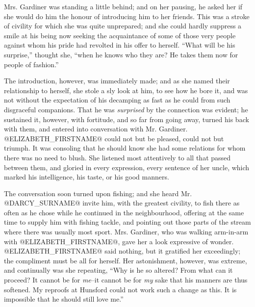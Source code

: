 Mrs. Gardiner was standing a little behind; and on her pausing, he asked
her if she would do him the honour of introducing him to her friends.
This was a stroke of civility for which she was quite unprepared;
and she could hardly suppress a smile at his being now seeking the
acquaintance of some of those very people against whom his pride had
revolted in his offer to herself. ``What will be his surprise,'' thought
she, ``when he knows who they are? He takes them now for people of
fashion.''

The introduction, however, was immediately made; and as she named their
relationship to herself, she stole a sly look at him, to see how he bore
it, and was not without the expectation of his decamping as fast as he
could from such disgraceful companions. That he was \textit{surprised} by the
connection was evident; he sustained it, however, with fortitude, and
so far from going away, turned his back with them, and entered into
conversation with Mr. Gardiner. @ELIZABETH_FIRSTNAME@ could not but be pleased,
could not but triumph. It was consoling that he should know she had
some relations for whom there was no need to blush. She listened most
attentively to all that passed between them, and gloried in every
expression, every sentence of her uncle, which marked his intelligence,
his taste, or his good manners.

The conversation soon turned upon fishing; and she heard Mr. @DARCY_SURNAME@
invite him, with the greatest civility, to fish there as often as he
chose while he continued in the neighbourhood, offering at the same time
to supply him with fishing tackle, and pointing out those parts of
the stream where there was usually most sport. Mrs. Gardiner, who was
walking arm-in-arm with @ELIZABETH_FIRSTNAME@, gave her a look expressive of wonder.
@ELIZABETH_FIRSTNAME@ said nothing, but it gratified her exceedingly; the compliment
must be all for herself. Her astonishment, however, was extreme, and
continually was she repeating, ``Why is he so altered? From what can
it proceed? It cannot be for \textit{me}--it cannot be for \textit{my} sake that his
manners are thus softened. My reproofs at Hunsford could not work such a
change as this. It is impossible that he should still love me.''

